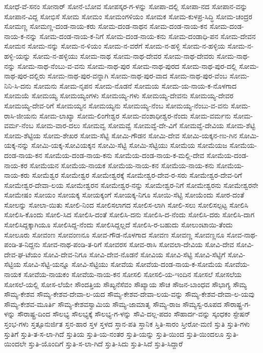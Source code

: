 ಸೋಧೆ-ವೆ-ಸನಂ
ಸೋನಾರ್
ಸೋನೆ-ಬೋವ
ಸೋಪಸ್ಕರ-ಗ-ಳನ್ನು
ಸೋಪಾ-ದಲ್ಲಿ
ಸೋಪಾ-ನದ
ಸೋಪಾನ-ವನ್ನು
ಸೋಪಾನ-ವಿದ್ದ
ಸೋಭಿಸೆ
ಸೋಮ
ಸೋಮಂ
ಸೋಮಂಗಳಿಯಂ
ಸೋಮಕ
ಸೋಮ-ಕುಳಪ್ರ-ಸಿದ್ಧಿ
ಸೋಮ-ಚಂದ್ರರ
ಸೋಮಣ್ಣ
ಸೋಮಣ್ಣ-ದಂಡ-ನಾಯ-ಕರು
ಸೋಮ-ದಂಡ-ನಾಥನ
ಸೋಮ-ದಂಡ-ನಾಯ-ಕನ
ಸೋಮ-ದಂಡ-ನಾಯ-ಕ-ನನ್ನು
ಸೋಮ-ದಂಡ-ನಾಯ-ಕ-ನಿಗೆ
ಸೋಮ-ದಂಡ-ನಾಯ-ಕನು
ಸೋಮ-ದಂಡಾಧಿ-ಪನ
ಸೋಮ-ದೇವನ
ಸೋಮನ
ಸೋಮ-ನನ್ನು
ಸೋಮ-ನ-ಳಿಯಂ
ಸೋಮ-ನ-ವರೆಗೆ
ಸೋಮ-ನ-ಹಳ್ಳಿ
ಸೋಮ-ನ-ಹಳ್ಳಿಯ
ಸೋಮ-ನ-ಹಳ್ಳಿ-ಯನ್ನು
ಸೋಮ-ನ-ಹಳ್ಳಿಯು
ಸೋಮ-ನಾಥ
ಸೋಮ-ನಾಥ-ದೇವರ
ಸೋಮ-ನಾಥ-ದೇವರು
ಸೋಮ-ನಾಥ-ನನ್ನು
ಸೋಮ-ನಾಥ-ನೆಂಬು-ವ-ವನು
ಸೋಮ-ನಾಥ-ಪುರ
ಸೋಮ-ನಾಥ-ಪುರದ
ಸೋಮ-ನಾಥ-ಪುರ-ದಲ್ಲಿ
ಸೋಮ-ನಾಥ-ಪುರ-ದಲ್ಲಿರು
ಸೋಮ-ನಾಥ-ಪುರ-ವನ್ನಾಗಿ
ಸೋಮ-ನಾಥ-ಪುರ-ವಾದ
ಸೋಮ-ನಾಥ-ಪುರ-ವೆಂಬ
ಸೋಮ-ನಿನಿ-ಸಿ-ದನು
ಸೋಮನು
ಸೋಮ-ನೃಪನ
ಸೋಮ-ನೊಡನೆ
ಸೋಮಯ
ಸೋಮ-ಯ-ನಾಯ-ಕ-ನೊಳಗಾದ
ಸೋಮಯೆ
ಸೋಮಯ್ಯ
ಸೋಮಯ್ಯಂಗಳು
ಸೋಮಯ್ಯ-ಗಳು
ಸೋಮಯ್ಯ-ದೇವನು
ಸೋಮಯ್ಯ-ದೇವರ
ಸೋಮಯ್ಯ-ದೇವ-ರಿಗೆ
ಸೋಮಯ್ಯನ
ಸೋಮಯ್ಯನು
ಸೋಮಯ್ಯ-ನೆಂಬ
ಸೋಮಯ್ಯ-ನೆಂಬು-ವ-ವನು
ಸೋಮ-ರಾಸಿ-ಜೀಯನು
ಸೋಮ-ಲಾಖ್ಯಾ
ಸೋಮ-ಲಿಂಗೇಶ್ವರ
ಸೋಮ-ವಂಶಾಧೀಶ್ವರ-ನೆಂದು
ಸೋಮ-ವರ್ಮನು
ಸೋಮ-ವರ್ಮ-ನೆಂಬ
ಸೋಮ-ವಾರ-ದಲು
ಸೋಮವ್ವ
ಸೋಮವ್ವೆ
ಸೋಮವ್ವೆ-ದೇ-ವಿಗೆ
ಸೋಮವ್ವೆ-ದೇವಿಯ
ಸೋಮ-ಶೆಟ್ಟಿ
ಸೋಮ-ಶೆಟ್ಟಿಯ
ಸೋಮ-ಶೇಖರ
ಸೋಮ-ಸೆಟ್ಟಿ
ಸೋಮಿ-ಗೌಡನ
ಸೋಮಿ-ದೇವ
ಸೋಮಿ-ಯಕ್ಕನ-ಣು-ಗಿನ
ಸೋಮಿ-ಯಕ್ಕ-ನನ್ನು
ಸೋಮಿ-ಯಕ್ಕ-ಸೋವಿಯಕ್ಕನ
ಸೋಮಿ-ಸೆಟ್ಟಿ
ಸೋಮಿ-ಸೆಟ್ಟಿಯು
ಸೋಮೆಯ
ಸೋಮೆಯಜ
ಸೋಮೆಯ-ದಂಡ-ನಾಯ-ಕನ
ಸೋಮೆಯ-ದಂಡ-ನಾಯ-ಕನು
ಸೋಮೆಯ-ದಂಡ-ನಾಯ-ಕ-ಮಲ್ಲಿ-ದೇವ
ಸೋಮೆಯ-ದಂಡ-ನಾಯ-ಕರ
ಸೋಮೆಯನ
ಸೋಮೆಯ-ನಾಯಕ
ಸೋಮೆಯ-ನಾಯ-ಕನ
ಸೋಮೆಯ-ನಾಯ-ಕನು
ಸೋಮೆಯ-ನಾಯ-ಕರು
ಸೋಮೆಶ್ವರ
ಸೋಮೇಶ್ವರ
ಸೋಮೇಶ್ವರಕ್ಕೆ
ಸೋಮೇಶ್ವರ-ದೇವ-ರ-ಸರು
ಸೋಮೇಶ್ವರ-ದೇವ-ರಿಗೆ
ಸೋಮೇಶ್ವರ-ದೇವಾ-ಲಯ
ಸೋಮೇಶ್ವರನ
ಸೋಮೇಶ್ವರ-ನನ್ನು
ಸೋಮೇಶ್ವರ-ನಿಗೆ
ಸೋಮೇಶ್ವರನು
ಸೋಮೇಶ್ವರನೇ
ಸೋಮೇಷಂ
ಸೋಯಂ
ಸೋಯಕ್ಕ
ಸೋಯಕ್ಕಂಗೆ
ಸೋಯಕ್ಕ-ನಿಗೂ
ಸೋಯಿ-ಸೆಟ್ಟಿ
ಸೋಯೆಂದು
ಸೋರ-ದಂತೆ
ಸೋಲನ್ನು
ಸೋಲಾ-ಯಿತು
ಸೋಲಿ-ನಿಂದ
ಸೋಲಿಸಲಾಗದ
ಸೋಲಿಸ-ಲಾಗಿ
ಸೋಲಿ-ಸಲು
ಸೋಲಿಸಲ್ಪಟ್ಟ
ಸೋಲಿಸಿ
ಸೋಲಿಸಿ-ಕೊಂದು
ಸೋಲಿ-ಸಿದ
ಸೋಲಿಸಿ-ದಂತೆ
ಸೋಲಿಸಿ-ದನು
ಸೋಲಿಸಿ-ದ-ನೆಂದು
ಸೋಲಿಸಿ-ದರು
ಸೋಲಿಸಿ-ದಾಗ
ಸೋಲಿಸಿದ್ದಕ್ಕಾಗಿಯೂ
ಸೋಲಿಸಿದ್ದ-ನೆಂದು
ಸೋಲಿಸಿದ್ದಲ್ಲದೆ
ಸೋಲಿಸಿ-ರ-ಬಹುದು
ಸೋಲುಂಟಾಯಿ-ತೆಂದು
ಸೋಲೂರು
ಸೋವಂಣ
ಸೋವಂಣನೂ
ಸೋವ-ಗೌಡ-ನೊಳಗಾದ
ಸೋವಣ
ಸೋವಣ್ಣ
ಸೋವಣ್ಣನೂ
ಸೋವ-ನಾಥ-ಪಂಡಿ-ತ-ನಿದ್ದನು
ಸೋವ-ನಾಥ-ಪಂಡಿ-ತ-ರಿಗೆ
ಸೋವರಸ
ಸೋವ-ರಾಸಿ
ಸೋವಲಾ-ದೇವಿಯ
ಸೋವಿ-ದೇವ
ಸೋವಿ-ದೇವ-ಘ-ಟೆಯಂ
ಸೋವಿ-ದೇವ-ನಿಗೂ
ಸೋವಿ-ದೇವ-ನೊಡನೆ
ಸೋವಿಯ
ಸೋವಿ-ಸೆಟ್ಟಿ
ಸೋವಿ-ಸೆಟ್ಟಿಗೆ
ಸೋವಿ-ಸೆಟ್ಟಿಯ
ಸೋವಿ-ಸೆಟ್ಟಿ-ಯನ್ನೂ
ಸೋವಿ-ಸೆಟ್ಟಿಯು
ಸೋವೆಯ
ಸೋವೆಯ-ದಂಡ-ನಾಯ-ಕ-ಸೋಮೆಯ
ಸೋವೆಯ-ನಾಯಕ
ಸೋವೆಯ-ನಾಯಕಂ
ಸೋವೆಯ-ನಾಯ-ಕನ
ಸೋಸಲಿ
ಸೋಸಲಿ-ಯ-ಇಂದಿನ
ಸೋಸಲೆ
ಸೋಸಲೆಯ
ಸೋಸಲೆ-ಯಲ್ಲಿ
ಸೋಸ-ಲೆಯೇ
ಸೌಂದತ್ತಿಯ
ಸೌಖ್ಯನೆಸೆವಂ
ಸೌಖ್ಯಾಯ
ಸೌಚ
ಸೌಜನ-ಬಾಂಧವ
ಸೌಭಾಗ್ಯ
ಸೌಮ್ಯ
ಸೌಮ್ಯ-ಕೇಶವ
ಸೌಮ್ಯ-ಕೇಶವ-ದೇವಾ-ಲ-ಯದ
ಸೌಮ್ಯ-ಕೇಶವ-ದೇವಾ-ಲಯ-ವನ್ನು
ಸೌಮ್ಯ-ಕೇಶವ-ದೇವಾ-ಲ-ಯವು
ಸೌಮ್ಯ-ಕೇಶವ-ಮೂರ್ತಿ
ಸೌಮ್ಯ-ಕೇಶವಸ್ವಾಮಿಯ
ಸೌಮ್ಯ-ಜಾಮಾತೃ
ಸೌಮ್ಯ-ರಾಜ
ಸೌಮ್ಯಸ್ವ-ರೂಪದ
ಸೌರಾಷ್ಟ್ರ-ಗ-ಳನ್ನು
ಸೌರಾಷ್ಟ್ರ-ದಿಂದ
ಸೌಲಭ್ಯ
ಸೌಲಭ್ಯಕ್ಕೆ
ಸೌಲಭ್ಯ-ಗ-ಳನ್ನು
ಸೌವಿ-ದಲ್ಲ-ಪದಂ
ಸೌಹಾರ್ದ-ವನ್ನು
ಸ್ಕಂಧಕಂ
ಸ್ಟೇಷನ್
ಸ್ತಂಭ-ಗಳು
ಸ್ತತ್ಸೂನುರ್ಜಿತ
ಸ್ತನ-ಹಾರ
ಸ್ತಳ
ಸ್ತಳದ
ಸ್ತಾನ-ಪತಿ
ಸ್ತಾನಿಕ
ಸ್ತಿತಿ-ಸಾರಂ
ಸ್ತೀರೋ-ಮಣಿ
ಸ್ತುತಿ
ಸ್ತುತಿ-ಗಳು
ಸ್ತುತಿಗೆ
ಸ್ತುತಿ-ತ-ಸ-ಲಾ-ಗಿದೆ
ಸ್ತುತಿಯ
ಸ್ತುತಿ-ಯ-ನಂತರ
ಸ್ತುತಿ-ಯನ್ನು
ಸ್ತುತಿ-ಯಿಂದ
ಸ್ತುತಿ-ಯಿಂದಲೂ
ಸ್ತುತಿ-ಯಿಂದಲೇ
ಸ್ತುತಿ-ಯೊಂದಿಗೆ
ಸ್ತುತಿ-ಸ-ಲಾ-ಗಿದೆ
ಸ್ತುತಿ-ಸಿದು
ಸ್ತುತಿ-ಸಿದೆ
ಸ್ತುತಿ-ಸಿದ್ದಾರೆ
